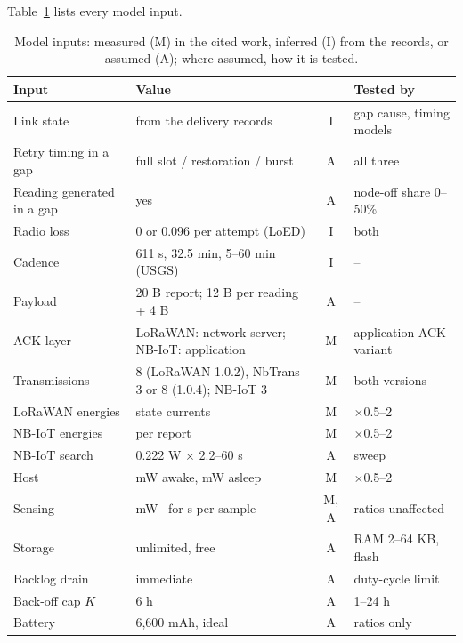 \documentclass[journal]{IEEEtran}
\begin{document}
Table~\ref{tab:s-assumptions} lists every model input.

\begin{table}[t]
\centering
\caption{Model inputs: measured (M) in the cited work, inferred (I) from the records, or assumed (A); where assumed, how it is tested.}
\label{tab:s-assumptions}
\scriptsize
\setlength{\tabcolsep}{2pt}
\begin{tabular}{@{}p{2.4cm}p{3.6cm}cp{1.9cm}@{}}
\toprule
Input & Value & & Tested by \\
\midrule
Link state & from the delivery records & I & gap cause, timing models \\
Retry timing in a gap & full slot / restoration / burst & A & all three \\
Reading generated in a gap & yes & A & node-off share 0--50\% \\
Radio loss & 0 or 0.096 per attempt (LoED) & I & both \\
Cadence & 611 s, 32.5 min, 5--60 min (USGS) & I & -- \\
Payload & 20 B report; 12 B per reading + 4 B & A & -- \\
ACK layer & LoRaWAN: network server; NB-IoT: application & M & application ACK variant \\
Transmissions & 8 (LoRaWAN 1.0.2), NbTrans 3 or 8 (1.0.4); NB-IoT 3 & M & both versions \\
LoRaWAN energies & state currents~\cite{casals2017lorawan} & M & $\times$0.5--2 \\
NB-IoT energies & per report~\cite{michelinakis2021dissecting} & M & $\times$0.5--2 \\
NB-IoT search & 0.222 W $\times$ 2.2--60 s & A & sweep \\
Host & \hostOnMW{} mW awake, \hostSleepMW{} mW asleep~\cite{libeliumwaspmote} & M & $\times$0.5--2 \\
Sensing & \hostSenseMW{} mW~\cite{libeliumsmartwater} for \tSenseS{} s per sample & M, A & ratios unaffected \\
Storage & unlimited, free & A & RAM 2--64 KB, flash \\
Backlog drain & immediate & A & duty-cycle limit \\
Back-off cap $K$ & 6 h & A & 1--24 h \\
Battery & 6{,}600 mAh, ideal & A & ratios only \\
\bottomrule
\end{tabular}
\end{table}
\end{document}
